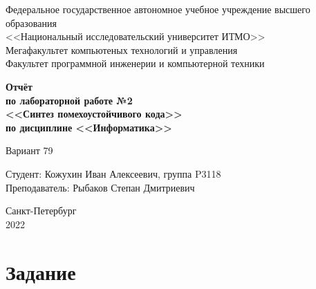 \documentclass[12pt]{article}
\begin{document}
\setcounter{page}{0}
\thispagestyle{empty}

\begin{center}
    Федеральное государственное автономное учебное учреждение высшего образования\\
    <<Национальный исследовательский университет ИТМО>>\\
\vspace{0.5cm}
    Мегафакультет компьютеных технологий и управления\\
    Факультет программной инженерии и компьютерной техники
\end{center}

\vspace{3cm}

\begin{center}
\Large
\textbf{
    Отчёт\\
    по лабораторной работе №2\\
    <<Синтез помехоустойчивого кода>>\\
    по дисциплине <<Информатика>>
}
\end{center}

\begin{center}
\large
    Вариант 79
\end{center}

\vspace{6cm}

\begin{flushright}
    Студент: Кожухин Иван Алексеевич, группа P3118\\
    Преподаватель: Рыбаков Степан Дмитриевич
\end{flushright}

\vspace{6cm}

\begin{center}
    Санкт-Петербург\\
    2022
\end{center}

\newpage

\tableofcontents

\newpage

\section{Задание}
\end{document}

